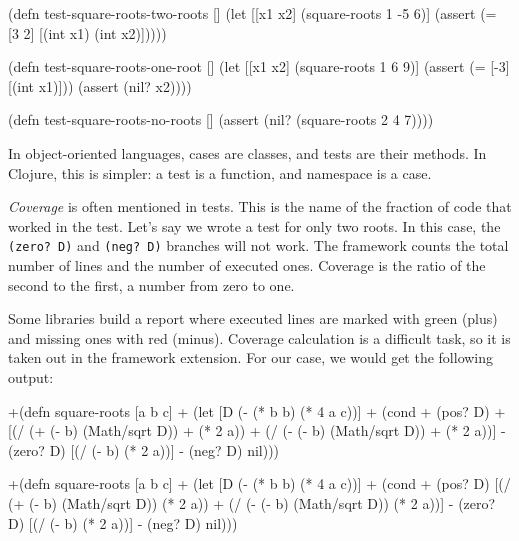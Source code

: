 \else

\begin{english}
  \begin{clojure}
(defn test-square-roots-two-roots []
  (let [[x1 x2] (square-roots 1 -5 6)]
    (assert (= [3 2] [(int x1) (int x2)]))))

(defn test-square-roots-one-root []
  (let [[x1 x2] (square-roots 1 6 9)]
    (assert (= [-3] [(int x1)]))
    (assert (nil? x2))))

(defn test-square-roots-no-roots []
  (assert (nil? (square-roots 2 4 7))))
  \end{clojure}
\end{english}

\fi

In object-oriented languages, cases are classes, and tests are their methods. In Clojure, this is simpler: a test is a function, and namespace is a case.


\emph{Coverage} is often mentioned in tests. This is the name of the fraction of code that worked in the test. Let's say we wrote a test for only two roots. In this case, the \verb|(zero? D)| and \verb|(neg? D)| branches will not work. The framework counts the total number of lines and the number of executed ones. Coverage is the ratio of the second to the first, a number from zero to one.

Some libraries build a report where executed lines are marked with green (plus) and missing ones with red (minus). Coverage calculation is a difficult task, so it is taken out in the framework extension. For our case, we would get the following output:

\ifx\DEVICETYPE\MOBILE

\begin{english}
  \begin{diff}
+(defn square-roots [a b c]
+  (let [D (- (* b b) (* 4 a c))]
+    (cond
+      (pos? D)
+      [(/ (+ (- b) (Math/sqrt D))
+          (* 2 a))
+       (/ (- (- b) (Math/sqrt D))
+          (* 2 a))]
-      (zero? D) [(/ (- b) (* 2 a))]
-      (neg? D) nil)))
  \end{diff}
\end{english}

\else

\begin{english}
  \begin{diff}
+(defn square-roots [a b c]
+  (let [D (- (* b b) (* 4 a c))]
+    (cond
+      (pos? D) [(/ (+ (- b) (Math/sqrt D)) (* 2 a))
+                (/ (- (- b) (Math/sqrt D)) (* 2 a))]
-      (zero? D) [(/ (- b) (* 2 a))]
-      (neg? D) nil)))
  \end{diff}
\end{english}
\fi

